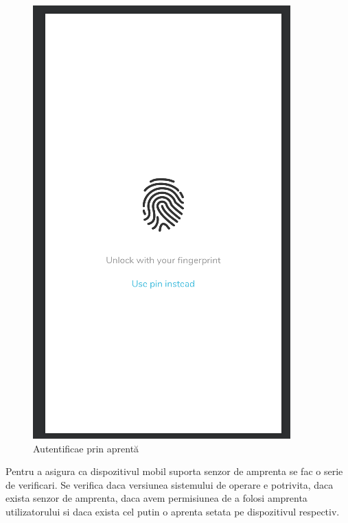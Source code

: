 \documentclass[12pt]{article}
\begin{document}
\begin{figure}[H]
\begin{minipage}[b]{0.4\textwidth}
    \includegraphics[width=\textwidth]{fingfrag.png}
    \caption{Autentificae prin aprentă}
\end{minipage}
\end{figure}

Pentru a asigura ca dispozitivul mobil suporta senzor de amprenta se fac o serie 
de verificari. Se verifica daca versiunea sistemului de operare e potrivita,
daca exista senzor de amprenta, daca avem permisiunea de a folosi amprenta utilizatorului
si daca exista cel putin o aprenta setata pe dispozitivul respectiv.
\end{document}
